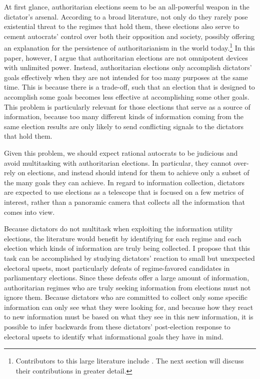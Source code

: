 \documentclass[12pt]{article}
\newcommand{\1}{\mathbbm{1}}
\begin{document}
At first glance, authoritarian elections seem to be an all-powerful weapon in the dictator's arsenal. According to a broad literature, not only do they rarely pose existential threat to the regimes that hold them, these elections also serve to cement autocrats' control over both their opposition and society, possibly offering an explanation for the persistence of authoritarianism in the world today.\footnote{Contributors to this large literature include \cite{Geddes2005,LustOkar2005,LustOkar2006,AR2005, Blaydes2008,Magaloni2006,GandhiPrzeworski2007,BoixSvolik2013,MaleskySchuler2011,Miller2015}. The next section will discuss their contributions in greater detail.} In this paper, however, I argue that authoritarian elections are not omnipotent devices with unlimited power. Instead, authoritarian elections only accomplish dictators' goals effectively when they are not intended for too many purposes at the same time. This is because there is a trade-off, such that an election that is designed to accomplish some goals becomes less effective at accomplishing some other goals. This problem is particularly relevant for those elections that serve as a source of information, because too many different kinds of information coming from the same election results are only likely to send conflicting signals to the dictators that hold them.

Given this problem, we should expect rational autocrats to be judicious and avoid multitasking with authoritarian elections. In particular, they cannot over-rely on elections, and instead should intend for them to achieve only a subset of the many goals they can achieve. In regard to information collection, dictators are expected to use elections as a telescope that is focused on a few metrics of interest, rather than a panoramic camera that collects all the information that comes into view.

Because dictators do not multitask when exploiting the information utility elections, the literature would benefit by identifying for each regime and each election which kinds of information are truly being collected. I propose that this task can be accomplished by studying dictators' reaction to small but unexpected electoral upsets, most particularly defeats of regime-favored candidates in parliamentary elections. Since these defeats offer a large amount of information, authoritarian regimes who are truly seeking information from elections must not ignore them. Because dictators who are committed to collect only some specific information can only see what they were looking for, and because how they react to new information must be based on what they see in this new information, it is possible to infer backwards from these dictators' post-election response to electoral upsets to identify what informational goals they have in mind.
\end{document}
